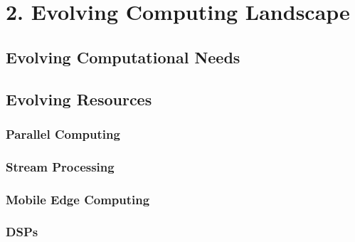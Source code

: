 \chapter{2. Evolving Computing Landscape}
\label{chapter:background}
\section{Evolving Computational Needs}
\section{Evolving Resources}
\subsection{Parallel Computing}
\subsection{Stream Processing}
\subsection{Mobile Edge Computing}
\subsection{DSPs}
